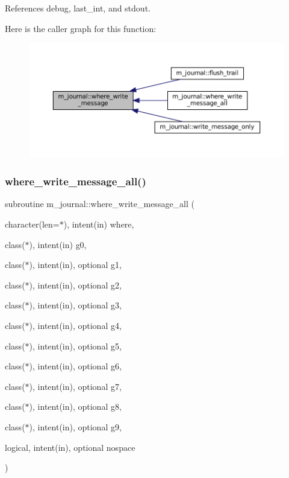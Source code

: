 References debug, last\+\_\+int, and stdout.

Here is the caller graph for this function\+:\nopagebreak
\begin{figure}[H]
\begin{center}
\leavevmode
\includegraphics[width=350pt]{namespacem__journal_a21238c3fc7731703c75eb39233ab529e_icgraph}
\end{center}
\end{figure}
\mbox{\label{namespacem__journal_a25d0f5da7f7e84e22ab0a583447412b1}} 
\subsubsection{\texorpdfstring{where\+\_\+write\+\_\+message\+\_\+all()}{where\_write\_message\_all()}}
{\footnotesize\ttfamily subroutine m\+\_\+journal\+::where\+\_\+write\+\_\+message\+\_\+all (\begin{DoxyParamCaption}\item[{character(len=$\ast$), intent(in)}]{where,  }\item[{class($\ast$), intent(in)}]{g0,  }\item[{class($\ast$), intent(in), optional}]{g1,  }\item[{class($\ast$), intent(in), optional}]{g2,  }\item[{class($\ast$), intent(in), optional}]{g3,  }\item[{class($\ast$), intent(in), optional}]{g4,  }\item[{class($\ast$), intent(in), optional}]{g5,  }\item[{class($\ast$), intent(in), optional}]{g6,  }\item[{class($\ast$), intent(in), optional}]{g7,  }\item[{class($\ast$), intent(in), optional}]{g8,  }\item[{class($\ast$), intent(in), optional}]{g9,  }\item[{logical, intent(in), optional}]{nospace }\end{DoxyParamCaption})\hspace{0.3cm}{\ttfamily [private]}}



